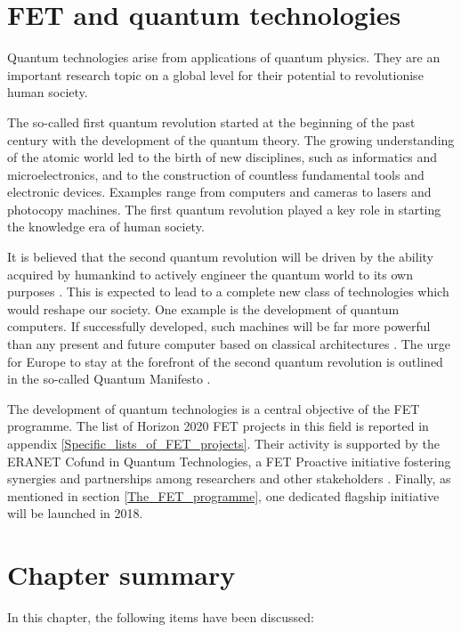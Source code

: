 \section{FET and quantum technologies} \label{FET_and_quantum_technologies}
Quantum technologies arise from applications of quantum physics. They are an important research topic on a global level for their potential to revolutionise human society.

The so-called first quantum revolution started at the beginning of the past century with the development of the quantum theory. The growing understanding of the atomic world led to the birth of new disciplines, such as informatics and microelectronics, and to the construction of countless fundamental tools and electronic devices. Examples range from computers and cameras to lasers and photocopy machines. The first quantum revolution played a key role in starting the knowledge era of human society.

It is believed that the second quantum revolution will be driven by the ability acquired by humankind to actively engineer the quantum world to its own purposes \cite{Dowling}. This is expected to lead to a complete new class of technologies which would reshape our society. One example is the development of quantum computers. If successfully developed, such machines will be far more powerful than any present and future computer based on classical architectures \cite{Rieffel}. The urge for Europe to stay at the forefront of the second quantum revolution is outlined in the so-called Quantum Manifesto \cite{QuantumManifesto}.

The development of quantum technologies is a central objective of the FET programme.  The list of Horizon 2020 FET projects in this field is reported in appendix \ref{Specific_lists_of_FET_projects}. Their activity is supported by the ERANET Cofund in Quantum Technologies, a FET Proactive initiative fostering synergies and partnerships among researchers and other stakeholders \cite{ERANET}. Finally, as mentioned in section \ref{The_FET_programme}, one dedicated flagship initiative will be launched in 2018. 

\section{Chapter summary} 
In this chapter, the following items have been discussed:

